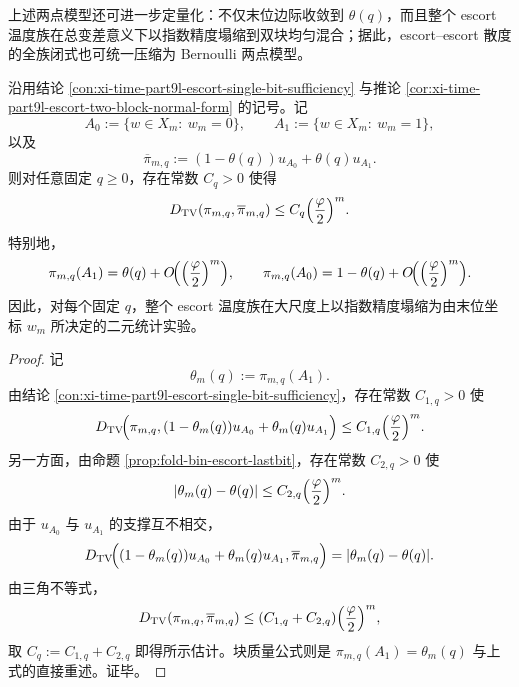 上述两点模型还可进一步定量化：不仅末位边际收敛到 \(\theta(q)\)，而且整个 escort 温度族在总变差意义下以指数精度塌缩到双块均匀混合；据此，escort--escort 散度的全族闭式也可统一压缩为 Bernoulli 两点模型。

\begin{theorem}\label{thm:xi-time-part9od-escort-tv-collapse-block-uniform}
沿用结论 \ref{con:xi-time-part9l-escort-single-bit-sufficiency} 与推论 \ref{cor:xi-time-part9l-escort-two-block-normal-form} 的记号。记
\[
A_0:=\{w\in X_m:\ w_m=0\},
\qquad
A_1:=\{w\in X_m:\ w_m=1\},
\]
以及
\[
\overline\pi_{m,q}:=(1-\theta(q))u_{A_0}+\theta(q)u_{A_1}.
\]
则对任意固定 \(q\ge 0\)，存在常数 \(C_q>0\) 使得
\[
D_{\mathrm{TV}}(\pi_{m,q},\overline\pi_{m,q})
\le
C_q\Bigl(\frac{\varphi}{2}\Bigr)^m.
\]
特别地，
\[
\pi_{m,q}(A_1)=\theta(q)+O\!\Bigl(\Bigl(\frac{\varphi}{2}\Bigr)^m\Bigr),
\qquad
\pi_{m,q}(A_0)=1-\theta(q)+O\!\Bigl(\Bigl(\frac{\varphi}{2}\Bigr)^m\Bigr).
\]
因此，对每个固定 \(q\)，整个 escort 温度族在大尺度上以指数精度塌缩为由末位坐标 \(w_m\) 所决定的二元统计实验。
\end{theorem}
\begin{proof}
记
\[
\theta_m(q):=\pi_{m,q}(A_1).
\]
由结论 \ref{con:xi-time-part9l-escort-single-bit-sufficiency}，存在常数 \(C_{1,q}>0\) 使
\[
D_{\mathrm{TV}}\!\Bigl(
\pi_{m,q},
(1-\theta_m(q))u_{A_0}+\theta_m(q)u_{A_1}
\Bigr)
\le
C_{1,q}\Bigl(\frac{\varphi}{2}\Bigr)^m.
\]
另一方面，由命题 \ref{prop:fold-bin-escort-lastbit}，存在常数 \(C_{2,q}>0\) 使
\[
|\theta_m(q)-\theta(q)|
\le
C_{2,q}\Bigl(\frac{\varphi}{2}\Bigr)^m.
\]
由于 \(u_{A_0}\) 与 \(u_{A_1}\) 的支撑互不相交，
\[
D_{\mathrm{TV}}\!\Bigl(
(1-\theta_m(q))u_{A_0}+\theta_m(q)u_{A_1},
\overline\pi_{m,q}
\Bigr)
=
|\theta_m(q)-\theta(q)|.
\]
由三角不等式，
\[
D_{\mathrm{TV}}(\pi_{m,q},\overline\pi_{m,q})
\le
(C_{1,q}+C_{2,q})\Bigl(\frac{\varphi}{2}\Bigr)^m,
\]
取 \(C_q:=C_{1,q}+C_{2,q}\) 即得所示估计。块质量公式则是
\(\pi_{m,q}(A_1)=\theta_m(q)\) 与上式的直接重述。证毕。
\end{proof}

